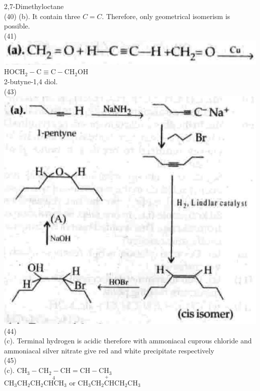 \documentclass[10pt]{article}
\begin{document}
2,7-Dimethyloctane\\
(40) (b). It contain three $C=C$. Therefore, only geometrical isomerism is possible.\\
(41)\\
\includegraphics[max width=\textwidth, center]{2025_01_28_8470952b98110cec3aabg-242(2)}\\
$\mathrm{HOCH}_{2}-\mathrm{C} \equiv \mathrm{C}-\mathrm{CH}_{2} \mathrm{OH}$\\
2-butyne-1,4 diol.\\
(43)\\
\includegraphics[max width=\textwidth, center]{2025_01_28_8470952b98110cec3aabg-242(6)}\\
(44)\\
(c). Terminal hydrogen is acidic therefore with ammoniacal cuprous chloride and ammoniacal silver nitrate give red and white precipitate respectively\\
(45)\\
(c). $\mathrm{CH}_{3}-\mathrm{CH}_{2}-\mathrm{CH}=\mathrm{CH}-\mathrm{CH}_{3}$\\
$\mathrm{CH}_{3} \mathrm{CH}_{2} \mathrm{CH}_{2} \stackrel{4}{\mathrm{CHCH}}_{3}$ or $\mathrm{CH}_{3} \mathrm{CH}_{2} \stackrel{+}{\mathrm{C}} \mathrm{HCH}_{2} \mathrm{CH}_{3}$\\
\end{document}
